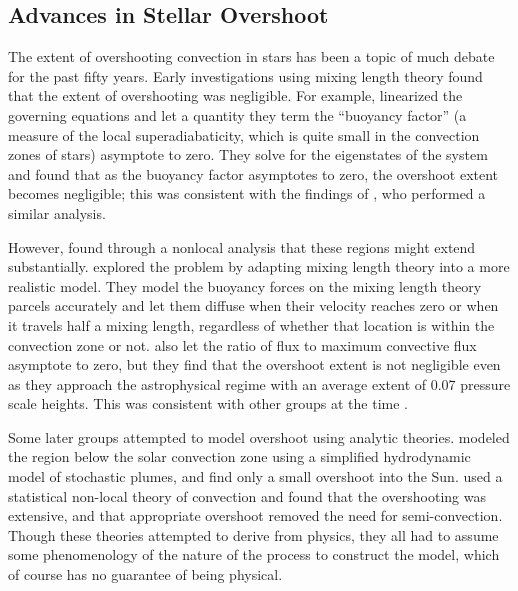 
\subsection{Advances in Stellar Overshoot} %
\label{sub:intro:osht:advances}

	The extent of overshooting convection in stars has been a topic of much debate for the past fifty years.
		Early investigations using mixing length theory found that the extent of overshooting was negligible.
			For example, \citet{Saslaw1965} linearized the governing equations and let a quantity they term the ``buoyancy factor'' (a measure of the local superadiabaticity, which is quite small in the convection zones of stars) asymptote to zero.
			They solve for the eigenstates of the system and found that as the buoyancy factor asymptotes to zero, the overshoot extent becomes negligible; this was consistent with the findings of \citet{Roxburgh1965}, who performed a similar analysis.

	However, \citet{Shaviv1973} found through a nonlocal analysis that these regions might extend substantially.
		\citet{Shaviv1973} explored the problem by adapting mixing length theory into a more realistic model.
		They model the buoyancy forces on the mixing length theory parcels accurately and let them diffuse when their velocity reaches zero or when it travels half a mixing length, regardless of whether that location is within the convection zone or not.
		\citet{Shaviv1973} also let the ratio of flux to maximum convective flux asymptote to zero, but they find that the overshoot extent is not negligible even as they approach the astrophysical regime with an average extent of 0.07 pressure scale heights. %
		This was consistent with other groups at the time \citep[e.g.]{Maeder1975}.
		
	Some later groups attempted to model overshoot using analytic theories.
		\citet{Schmitt1984} modeled the region below the solar convection zone using a simplified hydrodynamic model of stochastic plumes, and find only a small overshoot into the Sun.
		\citet{Xiong1986,Xiong2001} used a statistical non-local theory of convection and found that the overshooting was extensive, and that appropriate overshoot removed the need for semi-convection.
		Though these theories attempted to derive from physics, they all had to assume some phenomenology of the nature of the process to construct the model, which of course has no guarantee of being physical.
		
